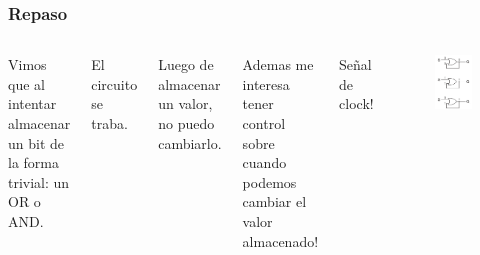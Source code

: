 \documentclass[10pt]{beamer}
\begin{document}
\begin{frame}
\frametitle{Repaso}

\begin{columns}
        Vimos que al intentar almacenar un bit de la forma trivial: un OR o AND.

El circuito se traba.

\vspace{1cm}

Luego de almacenar un valor, no puedo cambiarlo.
\vspace{1cm}

Ademas me interesa tener control sobre cuando podemos cambiar el valor almacenado!

Se\~nal de clock!


        \begin{figure}[h!]
            \centering
            \includegraphics[scale=0.3]{unbit.png}
        \end{figure}
\end{columns}
\end{frame}
\end{document}
